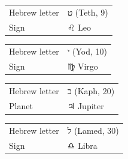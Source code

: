 \begin{center}
\resizebox{!}{60mm}{\cardAeight}
\end{center}

\vspace{4mm}
\noindent\begin{tabular}{@{}l@{\quad}l@{}}
Hebrew letter & {\hebrewfont ט} (Teth, 9) \\
Sign & {\symbfont ♌} Leo \\
\end{tabular}


\begin{center}
\resizebox{!}{60mm}{\cardAnine}
\end{center}

\vspace{4mm}
\noindent\begin{tabular}{@{}l@{\quad}l@{}}
Hebrew letter & {\hebrewfont י} (Yod, 10) \\
Sign & {\symbfont ♍} Virgo \\
\end{tabular}


\begin{center}
\resizebox{!}{60mm}{\cardAten}
\end{center}

\vspace{4mm}
\noindent\begin{tabular}{@{}l@{\quad}l@{}}
Hebrew letter & {\hebrewfont כ} (Kaph, 20) \\
Planet & {\symbfont ♃} Jupiter \\
\end{tabular}


\begin{center}
\resizebox{!}{60mm}{\cardAeleven}
\end{center}

\vspace{4mm}
\noindent\begin{tabular}{@{}l@{\quad}l@{}}
Hebrew letter & {\hebrewfont ל} (Lamed, 30) \\
Sign & {\symbfont ♎} Libra \\
\end{tabular}


\begin{center}
\resizebox{!}{60mm}{\cardAtwelve}
\end{center}

